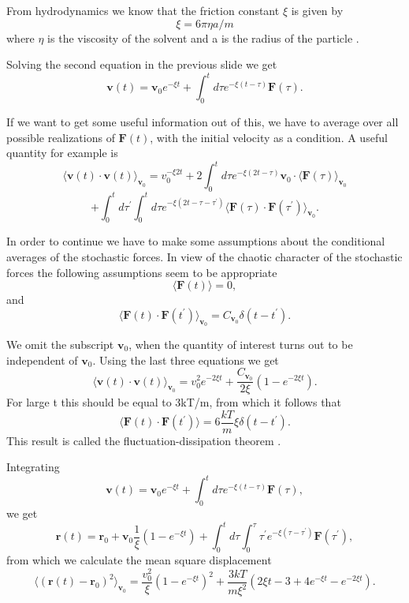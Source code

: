 \documentclass[%
oneside,                 %
final,                   %
10pt]{article}
\begin{document}
\noindent
From hydrodynamics  we know that the friction constant  $\xi$ is given by
\[
\xi =6\pi \eta a/m 
\]
where $\eta$ is the viscosity  of the solvent and a is the radius of the particle .

Solving the second equation in the previous slide we get 
\[
\mathbf{v}(t)=\mathbf{v}_{0}e^{-\xi t}+\int_{0}^{t}d\tau e^{-\xi (t-\tau )}\mathbf{F }(\tau ). 
\]

If we want to get some useful information out of this, we have to average over all possible realizations of 
$\mathbf{F}(t)$, with the initial velocity as a condition. A useful quantity for example is
\[ 
\langle \mathbf{v}(t)\cdot \mathbf{v}(t)\rangle_{\mathbf{v}_{0}}=v_{0}^{-\xi 2t}
+2\int_{0}^{t}d\tau e^{-\xi (2t-\tau)}\mathbf{v}_{0}\cdot \langle \mathbf{F}(\tau )\rangle_{\mathbf{v}_{0}}
\]
\[  	  	
 +\int_{0}^{t}d\tau ^{\prime }\int_{0}^{t}d\tau e^{-\xi (2t-\tau -\tau ^{\prime })}
\langle \mathbf{F}(\tau )\cdot \mathbf{F}(\tau ^{\prime })\rangle_{ \mathbf{v}_{0}}.
\]

In order to continue we have to make some assumptions about the conditional averages of the stochastic forces. 
In view of the chaotic character of the stochastic forces the following 
assumptions seem to be appropriate
\[ 
\langle \mathbf{F}(t)\rangle=0, 
\]
and
\[
\langle \mathbf{F}(t)\cdot \mathbf{F}(t^{\prime })\rangle_{\mathbf{v}_{0}}=  C_{\mathbf{v}_{0}}\delta (t-t^{\prime }).
\] 	

We omit the subscript $\mathbf{v}_{0}$, when the quantity of interest turns out to be independent of $\mathbf{v}_{0}$. Using the last three equations we get
 \[
\langle \mathbf{v}(t)\cdot \mathbf{v}(t)\rangle_{\mathbf{v}_{0}}=v_{0}^{2}e^{-2\xi t}+\frac{C_{\mathbf{v}_{0}}}{2\xi }(1-e^{-2\xi t}).
\]
For large t this should be equal to 3kT/m, from which it follows that
\[
\langle \mathbf{F}(t)\cdot \mathbf{F}(t^{\prime })\rangle =6\frac{kT}{m}\xi \delta (t-t^{\prime }). 
\]
This result is called the fluctuation-dissipation theorem .

Integrating 
 \[ 
\mathbf{v}(t)=\mathbf{v}_{0}e^{-\xi t}+\int_{0}^{t}d\tau e^{-\xi (t-\tau )}\mathbf{F }(\tau ), 
\] 
we get
\[
\mathbf{r}(t)=\mathbf{r}_{0}+\mathbf{v}_{0}\frac{1}{\xi }(1-e^{-\xi t})+
\int_0^td\tau \int_0^{\tau}\tau ^{\prime } e^{-\xi (\tau -\tau ^{\prime })}\mathbf{F}(\tau ^{\prime }), 
\]
from which we calculate the mean square displacement 
\[
\langle ( \mathbf{r}(t)-\mathbf{r}_{0})^{2}\rangle _{\mathbf{v}_{0}}=\frac{v_0^2}{\xi}(1-e^{-\xi t})^{2}+\frac{3kT}{m\xi ^{2}}(2\xi t-3+4e^{-\xi t}-e^{-2\xi t}). 
\]
\end{document}
